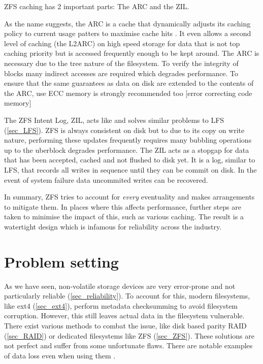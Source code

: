             ZFS caching has 2 important parts: The ARC and the ZIL.

            As the name suggests, the ARC is a cache that dynamically adjusts
            its caching policy to current usage patters to maximise cache hits
            \cite{ARC}. It even allows a second level of caching (the L2ARC) on
            high speed storage for data that is not top caching priority but is
            accessed frequently enough to be kept around. The ARC is necessary
            due to the tree nature of the filesystem. To verify the integrity
            of blocks many indirect accesses are required which degrades
            performance. To ensure that the same guarantees as data on disk are
            extended to the contents of the ARC, use ECC memory is strongly
            recommended too \cite{TrueNAS_hardware_guide}[error correcting code
            memory]

            The ZFS Intent Log, ZIL, acts like and solves similar problems to
            LFS (\ref{sec_LFS}). ZFS is always consistent on disk but to due to
            its copy on write nature, performing these updates frequently
            requires many bubbling operations up to the uberblock degrades
            performance.  The ZIL acts as a stopgap for data that has been
            accepted, cached and not flushed to disk yet. It is a log, similar
            to LFS, that records all writes in sequence until they can be
            commit on disk. In the event of system failure data uncommited
            writes can be recovered.

            In summary, ZFS tries to account for \textit{every} eventuality and
            makes arrangements to mitigate them. In places where this affects
            performance, further steps are taken to minimise the impact of
            this, such as various caching. The result is a watertight design
            which is infamous for reliability across the industry.

\chapter{Problem setting}

    As we have seen, non-volatile storage devices are very error-prone and not
    particularly reliable (\ref{sec_reliability}). To account for this, modern
    filesystems, like ext4 (\ref{sec_ext4}), perform metadata checksumming to
    avoid filesystem corruption. However, this still leaves actual data in the
    filesystem vulnerable. There exist various methods to combat the issue,
    like disk based parity RAID (\ref{sec_RAID}) or dedicated filesystems like
    ZFS (\ref{sec_ZFS}). These solutions are not perfect and suffer from some
    unfortunate flaws. There are notable examples of data loss even when using
    them \cite{LTT_data_loss}.

